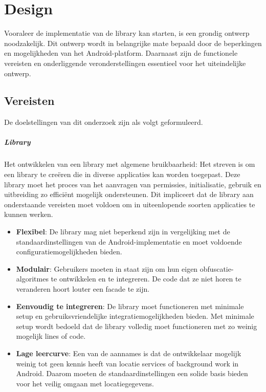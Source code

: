 \chapter{Design}\label{chap:design}
Vooraleer de implementatie van de library kan starten, is een grondig ontwerp noodzakelijk. Dit ontwerp wordt in belangrijke mate bepaald door de beperkingen en mogelijkheden van het Android-platform. Daarnaast zijn de functionele vereisten en onderliggende veronderstellingen essentieel voor het uiteindelijke ontwerp.
\section{Vereisten}
De doelstellingen van dit onderzoek zijn als volgt geformuleerd.
\paragraph{Library} Het ontwikkelen van een library met algemene bruikbaarheid: Het streven is om een library te creëren die in diverse applicaties kan worden toegepast. Deze library moet het proces van het aanvragen van permissies, initialisatie, gebruik en uitbreiding zo efficiënt mogelijk ondersteunen. Dit impliceert dat de library aan onderstaande vereisten moet voldoen om in uiteenlopende soorten applicaties te kunnen werken.
\begin{itemize}
    \item \textbf{Flexibel}: De library mag niet beperkend zijn in vergelijking met de standaardinstellingen van de Android-implementatie en moet voldoende configuratiemogelijkheden bieden.
    \item \textbf{Modulair}: Gebruikers moeten in staat zijn om hun eigen obfuscatie-algoritmes te ontwikkelen en te integreren. De code dat ze niet horen te veranderen hoort louter een facade te zijn.
    \item \textbf{Eenvoudig te integreren}: De library moet functioneren met minimale setup en gebruiksvriendelijke integratiemogelijkheden bieden. Met minimale setup wordt bedoeld dat de library volledig moet functioneren met zo weinig mogelijk lines of code.
    \item \textbf{Lage leercurve}: Een van de aannames is dat de ontwikkelaar mogelijk weinig tot geen kennis heeft van locatie services of background work in Android. Daarom moeten de standaardinstellingen een solide basis bieden voor het veilig omgaan met locatiegegevens.
\end{itemize}
